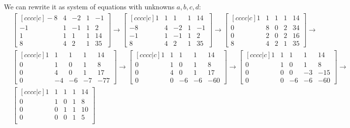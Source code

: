 \documentclass{article}
\begin{document}
\begin{enumerate}
We can rewrite it as system of equations with unknowns $a, b, c, d$:
\begin{align*}
&\begin{bmatrix}[cccc|c]
-8 & 4 & -2 & 1 & -1\\
-1 & 1 & -1 & 1 & 2\\
1 & 1 & 1 & 1 & 14\\
8 & 4 & 2 & 1 & 35
\end{bmatrix}
\to
\begin{bmatrix}[cccc|c]
1 & 1 & 1 & 1 & 14\\
-8 & 4 & -2 & 1 & -1\\
-1 & 1 & -1 & 1 & 2\\
8 & 4 & 2 & 1 & 35
\end{bmatrix}
\to
\begin{bmatrix}[cccc|c]
1 & 1 & 1 & 1 & 14\\
0 & 8 & 0 & 2 & 34\\
0 & 2 & 0 & 2 & 16\\
8 & 4 & 2 & 1 & 35
\end{bmatrix}
\to\\
&\begin{bmatrix}[cccc|c]
1 & 1 & 1 & 1 & 14\\
0 & 1 & 0 & 1 & 8\\
0 & 4 & 0 & 1 & 17\\
0 & -4 & -6 & -7 & -77
\end{bmatrix}
\to
\begin{bmatrix}[cccc|c]
1 & 1 & 1 & 1 & 14\\
0 & 1 & 0 & 1 & 8\\
0 & 4 & 0 & 1 & 17\\
0 & 0 & -6 & -6 & -60
\end{bmatrix}
\to
\begin{bmatrix}[cccc|c]
1 & 1 & 1 & 1 & 14\\
0 & 1 & 0 & 1 & 8\\
0 & 0 & 0 & -3 & -15\\
0 & 0 & -6 & -6 & -60
\end{bmatrix}
\to\\
&\begin{bmatrix}[cccc|c]
1 & 1 & 1 & 1 & 14\\
0 & 1 & 0 & 1 & 8\\
0 & 0 & 1 & 1 & 10\\
0 & 0 & 0 & 1 & 5\\
\end{bmatrix}
\end{align*}


\end{enumerate}
\end{document}
